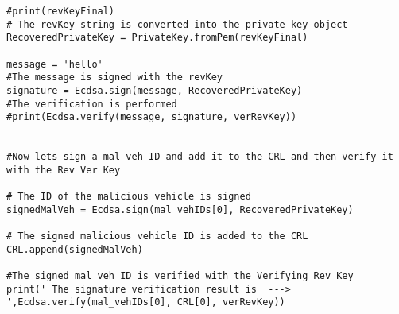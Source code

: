 \begin{linenumbers}
\begin{lstlisting}
#print(revKeyFinal)
# The revKey string is converted into the private key object
RecoveredPrivateKey = PrivateKey.fromPem(revKeyFinal)

message = 'hello'
#The message is signed with the revKey
signature = Ecdsa.sign(message, RecoveredPrivateKey)
#The verification is performed
#print(Ecdsa.verify(message, signature, verRevKey))


#Now lets sign a mal veh ID and add it to the CRL and then verify it with the Rev Ver Key

# The ID of the malicious vehicle is signed
signedMalVeh = Ecdsa.sign(mal_vehIDs[0], RecoveredPrivateKey)

# The signed malicious vehicle ID is added to the CRL
CRL.append(signedMalVeh)

#The signed mal veh ID is verified with the Verifying Rev Key
print(' The signature verification result is  ---> ',Ecdsa.verify(mal_vehIDs[0], CRL[0], verRevKey))



\end{lstlisting}
\end{linenumbers} 
